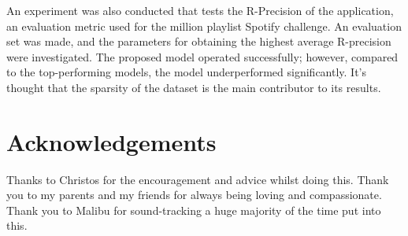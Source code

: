 An experiment was also conducted that tests the R-Precision of the application, an evaluation metric used for the million playlist Spotify challenge. An evaluation set was made, and the parameters for obtaining the highest average R-precision were investigated. The proposed model operated successfully; however, compared to the top-performing models, the model underperformed significantly. It's thought that the sparsity of the dataset is the main contributor to its results.

\frontmatter

\singlespacing

\setlength{\parskip}{0ex} %

\clearpage
{}
\tableofcontents
\clearpage
{}
{}
\listoffigures
\clearpage
{}
{}


\setlength{\parskip}{1ex plus 0.2ex minus 0.2ex} %

\onehalfspacing

\chapter{Acknowledgements}

Thanks to Christos for the encouragement and advice whilst doing this. Thank you to my parents and my friends for always being loving and compassionate. Thank you to Malibu for sound-tracking a huge majority of the time put into this.